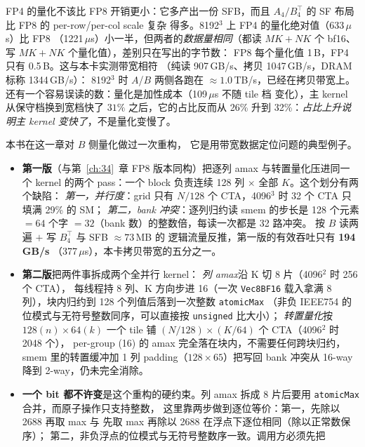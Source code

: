 FP4 的量化不该比 FP8 开销更小：它多产出一份
SFB，而且 $A_4/B_4^{\top}$ 的 SF 布局比 FP8 的 per-row/per-col scale 复杂
得多。8192$^3$ 上 FP4 的量化绝对值（633\,$\mu$s）比 FP8
（1221\,$\mu$s）小一半，但两者的\emph{数据量相同}（都读 $MK{+}NK$ 个
bf16、写 $MK{+}NK$ 个量化值），差别只在写出的字节数：
FP8 每个量化值 1\,B，FP4 只有 0.5\,B。这与本卡实测带宽相符
（纯读 907\,GB/s、拷贝 1047\,GB/s，DRAM 标称 1344\,GB/s）：
8192$^3$ 时 $A$/$B$ 两侧各跑在 $\approx1.0$\,TB/s，已经在拷贝带宽上。
还有一个容易误读的数：量化是加性成本（109\,$\mu$s 不随 tile 档
变化），主 kernel 从保守档换到宽档快了 $31\%$ 之后，它的占比反而从
26\% 升到 32\%：\emph{占比上升说明主 kernel 变快了}，不是量化变慢了。

本书在这一章对 $B$ 侧量化做过一次重构，
它是用带宽数据定位问题的典型例子。

\begin{itemize}[itemsep=2pt,topsep=3pt]
  \item \textbf{第一版}（与第~\ref{ch:34}~章 FP8 版本同构）把逐列 amax
        与转置量化压进同一个 kernel 的两个 pass：一个 block 负责连续
        128 列 $\times$ 全部 $K$。这个划分有两个缺陷：
        \emph{第一，并行度}：grid 只有 $N/128$ 个 CTA，4096$^3$ 时
        32 个 CTA 只填满 29\% 的 SM；
        \emph{第二，bank 冲突}：逐列归约读 smem 的步长是 128 个元素
        $= 64$ 个字 $= 32$（bank 数）的整数倍，每读一次都是 32 路冲突。
        按 $B$ 读两遍 $+$ 写 $B_4^{\top}$ 与 SFB $\approx73$\,MB 的
        逻辑流量反推，第一版的有效吞吐只有 \textbf{194\,GB/s}
        （377\,$\mu$s），本卡拷贝带宽的五分之一。
  \item \textbf{第二版}把两件事拆成两个全并行 kernel：
        \emph{列 amax}沿 K 切 8 片（4096$^2$ 时 256 个 CTA），
        每线程持 8 列、K 方向步进 16（一次 \texttt{Vec8BF16} 载入拿满
        8 列），块内归约到 128 个列值后落到一次整数 \texttt{atomicMax}
        （非负 IEEE754 的位模式与无符号整数同序，可以直接按
        \texttt{unsigned} 比大小）；
        \emph{转置量化}按 $128(n)\times64(k)$ 一个 tile 铺
        $(N/128)\times(K/64)$ 个 CTA（4096$^2$ 时 2048 个），
        per-group (16) 的 amax 完全落在块内，不需要任何跨块归约，
        smem 里的转置缓冲加 1 列 padding（$128{\times}65$）把写回 bank 冲突从
        16-way 降到 2-way，仍未完全消除。
  \item \textbf{一个 bit 都不许变}是这个重构的硬约束。列 amax 拆成
        8 片后要用 \texttt{atomicMax} 合并，而原子操作只支持整数，
        这里靠两步做到逐位等价：第一，先除以 2688 再取 max 与
        先取 max 再除以 2688 在浮点下逐位相同（除以正常数保序）；
        第二，非负浮点的位模式与无符号整数序一致。调用方必须先把

\end{itemize}

